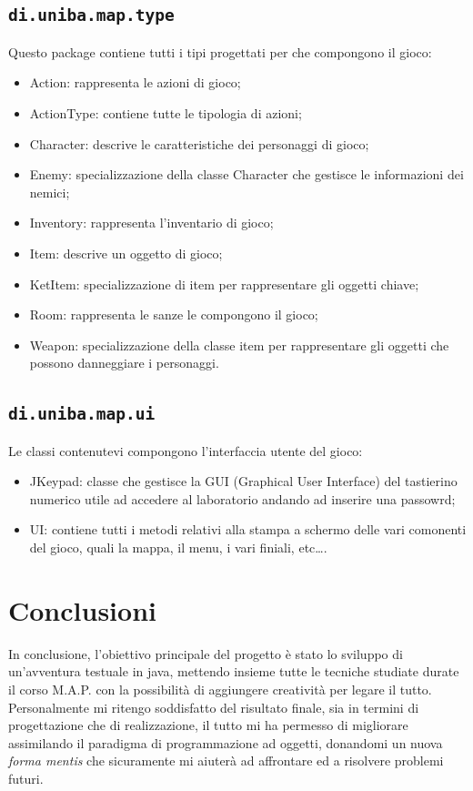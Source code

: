 \documentclass[italian,12pt,a4paper]{article}
\begin{document}
	\subsection{\texttt{di.uniba.map.type}}
	Questo package contiene tutti i tipi progettati per che compongono il gioco:
	\begin{itemize}
		\item Action: rappresenta le azioni di gioco;
		\item ActionType: contiene tutte le tipologia di azioni;
		\item Character: descrive le caratteristiche dei personaggi di gioco;
		\item Enemy: specializzazione della classe Character che gestisce le informazioni dei nemici;
		\item Inventory: rappresenta l'inventario di gioco; 
		\item Item: descrive un oggetto di gioco;
		\item KetItem: specializzazione di item per rappresentare gli oggetti chiave;
		\item Room: rappresenta le sanze le compongono il gioco;
		\item Weapon: specializzazione della classe item per rappresentare gli oggetti che possono danneggiare i personaggi.
	\end{itemize}
	
	\subsection{\texttt{di.uniba.map.ui}}
	Le classi contenutevi compongono l'interfaccia utente del gioco: 
	\begin{itemize}
		\item JKeypad: classe che gestisce la GUI (Graphical User Interface) del tastierino numerico utile ad accedere al laboratorio andando ad inserire una passowrd;
		\item UI: contiene tutti i metodi relativi alla stampa a schermo delle vari comonenti del gioco, quali la mappa, il menu, i vari finiali, etc\dots.
	\end{itemize}
	\section{Conclusioni}
	
	In conclusione, l'obiettivo principale del progetto è stato lo sviluppo di un'avventura testuale in java, mettendo insieme tutte le tecniche studiate durate il corso M.A.P. con la possibilità di aggiungere creatività per legare il tutto.\\
	\linebreak
	Personalmente mi ritengo soddisfatto del risultato finale, sia in termini di progettazione che di realizzazione, il tutto mi ha permesso di migliorare assimilando il paradigma di programmazione ad oggetti, donandomi un nuova \textit{forma mentis} che sicuramente mi aiuterà ad affrontare ed a risolvere problemi futuri. 
\end{document}
